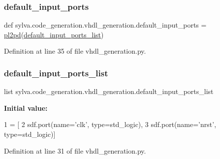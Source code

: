 \subsubsection{\texorpdfstring{default\+\_\+input\+\_\+ports}{default\_input\_ports}}
{\footnotesize\ttfamily def sylva.\+code\+\_\+generation.\+vhdl\+\_\+generation.\+default\+\_\+input\+\_\+ports = \hyperlink{namespacesylva_1_1code__generation_1_1vhdl__generation_a10ea31d6ea98aa308e635b9403f5721f}{pl2pd}(\hyperlink{namespacesylva_1_1code__generation_1_1vhdl__generation_a2373c5e8bd084e84746b1b6b947a2667}{default\+\_\+input\+\_\+ports\+\_\+list})}



Definition at line 35 of file vhdl\+\_\+generation.\+py.

\mbox{\label{namespacesylva_1_1code__generation_1_1vhdl__generation_a2373c5e8bd084e84746b1b6b947a2667}} 
\subsubsection{\texorpdfstring{default\+\_\+input\+\_\+ports\+\_\+list}{default\_input\_ports\_list}}
{\footnotesize\ttfamily list sylva.\+code\+\_\+generation.\+vhdl\+\_\+generation.\+default\+\_\+input\+\_\+ports\+\_\+list}

{\bfseries Initial value\+:}
\begin{DoxyCode}
1 =  [
2     sdf.port(name=\textcolor{stringliteral}{'clk'}, type=std\_logic),
3     sdf.port(name=\textcolor{stringliteral}{'nrst'}, type=std\_logic)]
\end{DoxyCode}


Definition at line 31 of file vhdl\+\_\+generation.\+py.

\mbox{\label{namespacesylva_1_1code__generation_1_1vhdl__generation_a10ea31d6ea98aa308e635b9403f5721f}} 
